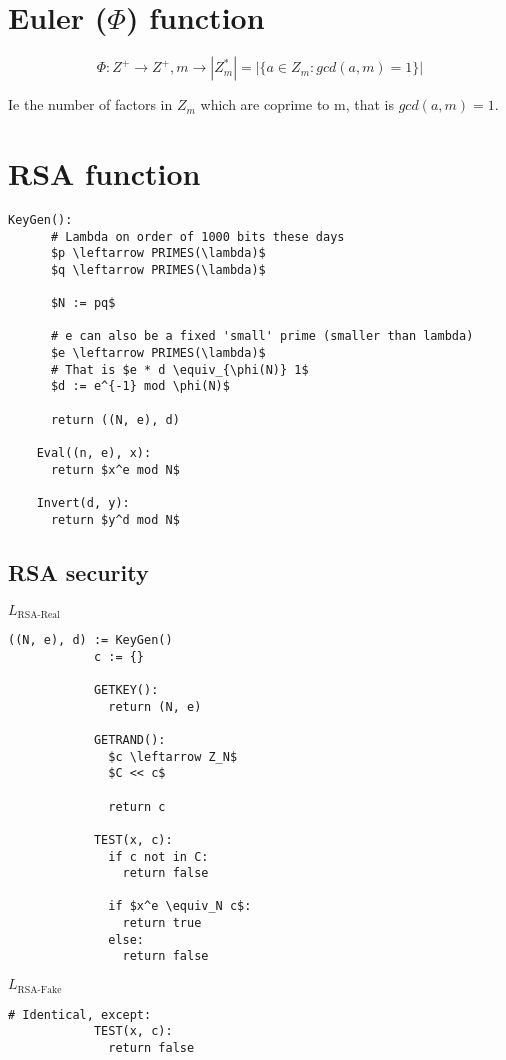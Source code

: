 \documentclass[a4paper]{scrreprt}
\begin{document}
\section{Euler ($\Phi$) function}

\[
	\Phi: Z^{+} \rightarrow Z^{+}, m \rightarrow |Z^{*}_m| = |\{a \in Z_m : gcd(a, m) = 1\}|
\]

Ie the number of factors in $Z_m$ which are coprime to m, that is $gcd(a, m) =
1$.

\section{RSA function}

\begin{lstlisting}[mathescape=true,autogobble=true]
	KeyGen():
	  # Lambda on order of 1000 bits these days
	  $p \leftarrow PRIMES(\lambda)$
	  $q \leftarrow PRIMES(\lambda)$

	  $N := pq$

	  # e can also be a fixed 'small' prime (smaller than lambda)
	  $e \leftarrow PRIMES(\lambda)$
	  # That is $e * d \equiv_{\phi(N)} 1$
	  $d := e^{-1} mod \phi(N)$

	  return ((N, e), d)

	Eval((n, e), x):
	  return $x^e mod N$

	Invert(d, y):
	  return $y^d mod N$
\end{lstlisting}


\subsection{RSA security}


\begin{tcbraster}[raster columns=2,raster equal height,nobeforeafter,raster column skip=2cm]
	\begin{library}{$L_{\text{RSA-Real}}$}
		\begin{lstlisting}[mathescape=true,autogobble=true]
			((N, e), d) := KeyGen()
			c := {}

			GETKEY():
			  return (N, e)

			GETRAND():
			  $c \leftarrow Z_N$
			  $C << c$

			  return c

			TEST(x, c):
			  if c not in C:
			    return false

			  if $x^e \equiv_N c$:
			    return true
			  else:
			    return false
		\end{lstlisting}
	\end{library}
	\begin{library}{$L_{\text{RSA-Fake}}$}
		\begin{lstlisting}[mathescape=true,autogobble=true]
			# Identical, except:
			TEST(x, c):
			  return false
		\end{lstlisting}
	\end{library}
\end{tcbraster}
\end{document}
